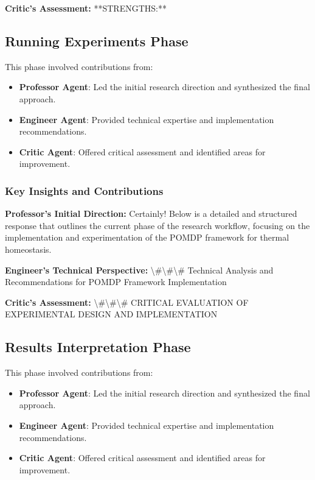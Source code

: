 \documentclass[11pt,a4paper]{article}
\begin{document}
\textbf{Critic's Assessment:} **STRENGTHS:**


\subsection{Running Experiments Phase}


This phase involved contributions from:

\begin{itemize}
\item \textbf{Professor Agent}: Led the initial research direction and synthesized the final approach.
\item \textbf{Engineer Agent}: Provided technical expertise and implementation recommendations.
\item \textbf{Critic Agent}: Offered critical assessment and identified areas for improvement.
\end{itemize}

\subsubsection{Key Insights and Contributions}


\textbf{Professor's Initial Direction:} Certainly! Below is a detailed and structured response that outlines the current phase of the research workflow, focusing on the implementation and experimentation of the POMDP framework for thermal homeostasis.


\textbf{Engineer's Technical Perspective:} \textbackslash{}#\textbackslash{}#\textbackslash{}# Technical Analysis and Recommendations for POMDP Framework Implementation


\textbf{Critic's Assessment:} \textbackslash{}#\textbackslash{}#\textbackslash{}# CRITICAL EVALUATION OF EXPERIMENTAL DESIGN AND IMPLEMENTATION


\subsection{Results Interpretation Phase}


This phase involved contributions from:

\begin{itemize}
\item \textbf{Professor Agent}: Led the initial research direction and synthesized the final approach.
\item \textbf{Engineer Agent}: Provided technical expertise and implementation recommendations.
\item \textbf{Critic Agent}: Offered critical assessment and identified areas for improvement.
\end{itemize}
\end{document}
